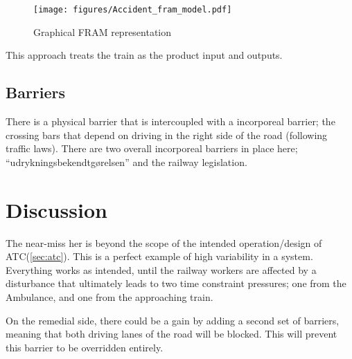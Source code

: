 \begin{figure}[h]
 \centering
   \texttt{[image: figures/Accident\_fram\_model.pdf]}
 \caption{Graphical FRAM representation}
 \label{fig:fram_graphical}
\end{figure}

This approach treats the train as the product input and outputs.

\subsection{Barriers}
There is a physical barrier that is intercoupled with a incorporeal barrier; the crossing bars that depend on driving in the right side of the road (following traffic laws).
There are two overall incorporeal barriers in place here; ``udrykningsbekendtgørelsen'' and the railway legislation.
\section{Discussion}

The near-miss her is beyond the scope of the intended operation/design of ATC(\ref{sec:atc}). This is a perfect example of high variability in a system. Everything works as intended, until the railway workers are affected by a disturbance that ultimately leads to two time constraint pressures; one from the Ambulance, and one from the approaching train.

On the remedial side, there could be a gain by adding a second set of barriers, meaning that both driving lanes of the road will be blocked. This will prevent this barrier to be overridden entirely.

